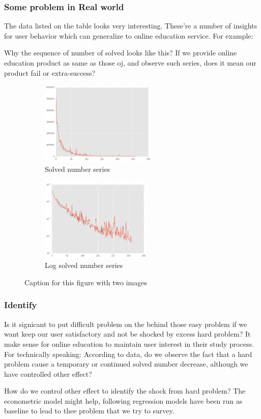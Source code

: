 \documentclass{beamer}
\begin{document}
\begin{frame}
\frametitle{Some problem in Real world}

The data listed on the table looks very interesting. These're a number of insights for user behavior which 
can generalize to online education service. For example:

Why the sequence of number of solved looks like this? If we provide online education product as same as those oj, 
and observe such series, does it mean our product fail or extra-success?

\begin{figure}[h]
 
\begin{subfigure}{0.45\textwidth}
\includegraphics[width=0.9\linewidth, height=4cm]{solved-seq1.png} 
\caption{Solved number series}
\label{fig:f1}
\end{subfigure}
\begin{subfigure}{0.45\textwidth}
\includegraphics[width=0.9\linewidth, height=4cm]{solved-seq2.png}
\caption{Log solved number series}
\label{fig:f2}
\end{subfigure}
 
\caption{Caption for this figure with two images}
\label{fig:image2}
\end{figure}

\end{frame}

\begin{frame}

\frametitle{Identify}

Is it signicant to put difficult problem on the behind those easy problem 
if we want keep our user satisfactory and not be shocked by excess hard problem? It make sense
for online education to maintain user interest in their study process. For technically speaking:
According to data, do we observe the fact that a hard problem cause a temporary 
or continued solved number decrease, although we have controlled other effect? 

How do we control other effect to identify the shock from hard problem? The econometric model might help, 
following regression models have been run as baseline to lead to thee problem that we try to survey.

\end{frame}
\end{document}
